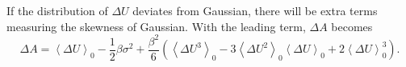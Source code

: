 If the distribution of $\Delta U$ deviates from Gaussian, there will be extra terms measuring the skewness of Gaussian. With the leading term, $\Delta A$ becomes
\begin{equation}
  \Delta A = \left< \Delta U \right>_{0} - \frac{1}{2} \beta \sigma ^2 + \frac{\beta^2}{6} \left(\left<\Delta U^3\right>_0-3\left<\Delta U^2\right>_0\left<\Delta U\right>_0+2\left<\Delta U\right>_0^3\right).
  \label{Eq:FEM:TP:deltaA9}
\end{equation}

